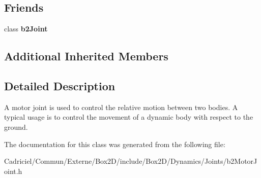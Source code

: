 \subsection*{Friends}
\begin{DoxyCompactItemize}
\item 
class {\bfseries b2\+Joint}\hypertarget{classb2_motor_joint_a54ade8ed3d794298108d7f4c4e4793fa}{}\label{classb2_motor_joint_a54ade8ed3d794298108d7f4c4e4793fa}

\end{DoxyCompactItemize}
\subsection*{Additional Inherited Members}


\subsection{Detailed Description}
A motor joint is used to control the relative motion between two bodies. A typical usage is to control the movement of a dynamic body with respect to the ground. 

The documentation for this class was generated from the following file\+:\begin{DoxyCompactItemize}
\item 
Cadriciel/\+Commun/\+Externe/\+Box2\+D/include/\+Box2\+D/\+Dynamics/\+Joints/b2\+Motor\+Joint.\+h\end{DoxyCompactItemize}
